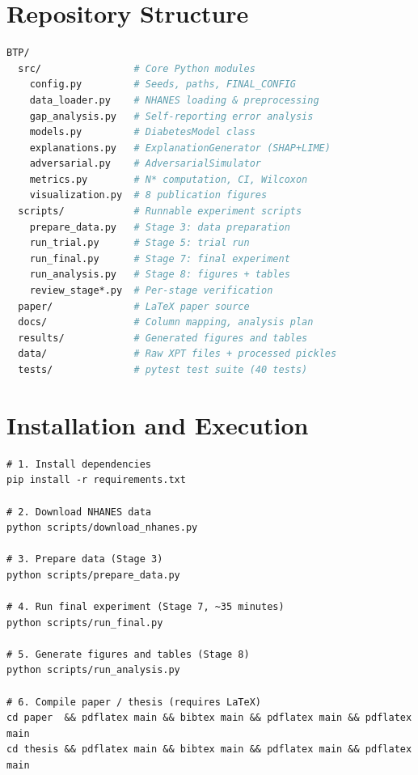 \documentclass[12pt, a4paper, oneside]{report}
\theoremstyle{definition}
\begin{document}
\section{Repository Structure}
\begin{lstlisting}[language=bash]
BTP/
  src/                # Core Python modules
    config.py         # Seeds, paths, FINAL_CONFIG
    data_loader.py    # NHANES loading & preprocessing
    gap_analysis.py   # Self-reporting error analysis
    models.py         # DiabetesModel class
    explanations.py   # ExplanationGenerator (SHAP+LIME)
    adversarial.py    # AdversarialSimulator
    metrics.py        # N* computation, CI, Wilcoxon
    visualization.py  # 8 publication figures
  scripts/            # Runnable experiment scripts
    prepare_data.py   # Stage 3: data preparation
    run_trial.py      # Stage 5: trial run
    run_final.py      # Stage 7: final experiment
    run_analysis.py   # Stage 8: figures + tables
    review_stage*.py  # Per-stage verification
  paper/              # LaTeX paper source
  docs/               # Column mapping, analysis plan
  results/            # Generated figures and tables
  data/               # Raw XPT files + processed pickles
  tests/              # pytest test suite (40 tests)
\end{lstlisting}

\section{Installation and Execution}
\begin{lstlisting}
# 1. Install dependencies
pip install -r requirements.txt

# 2. Download NHANES data
python scripts/download_nhanes.py

# 3. Prepare data (Stage 3)
python scripts/prepare_data.py

# 4. Run final experiment (Stage 7, ~35 minutes)
python scripts/run_final.py

# 5. Generate figures and tables (Stage 8)
python scripts/run_analysis.py

# 6. Compile paper / thesis (requires LaTeX)
cd paper  && pdflatex main && bibtex main && pdflatex main && pdflatex main
cd thesis && pdflatex main && bibtex main && pdflatex main && pdflatex main
\end{lstlisting}



\end{document}
